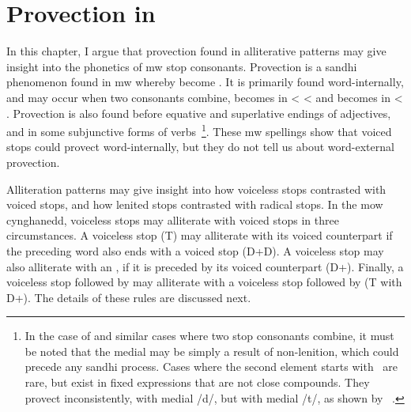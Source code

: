 \chapter{Provection in }
\label{cha:prov-mwbe-y}

In this chapter, I argue that provection found in alliterative patterns may give insight into the phonetics of \gls{mw} stop consonants.
Provection is a sandhi phenomenon found in \gls{mw} whereby  become .  It is primarily found word-internally, and
may occur when two consonants combine, \eg {} becomes 
in   <  <  and  becomes  in  < .
Provection is also found before equative and superlative endings of
adjectives, and in some subjunctive forms of
verbs~\autocite[§~17]{evans_grammar_1964}\footnote{In the case
  of  and similar cases where two stop consonants combine,
  it must be noted that the medial  may be simply a result of
  non-lenition, which could precede any sandhi process. Cases where
  the second element starts with \xD\ are rare, but exist in fixed
  expressions that are not close compounds. They provect
  inconsistently, \eg {} with
  medial /d/, but  with medial /t/, as
  shown by ~\autocite[s.v.~\emph{rhad}]{bevan_geiriadur_2014}.}.
These \gls{mw} spellings show that voiced stops could provect
word-internally, but they do not tell us about word-external
provection.

Alliteration patterns may give insight into how voiceless stops
contrasted with voiced stops, and how lenited stops contrasted with
radical stops. In the \gls{mow} cynghanedd, voiceless stops may
alliterate with voiced stops in three circumstances. A voiceless stop
(\gls{T}) may alliterate with its voiced counterpart if the
preceding word also ends with a voiced stop (\gls{D}+\gls{D}). A
voiceless stop may also alliterate with an , if it is preceded
by its voiced counterpart (\gls{D}+). Finally, a voiceless stop
followed by  may alliterate with a voiceless stop followed
by  (\gls{T} with \gls{D}+).
The details of these rules are discussed next.

